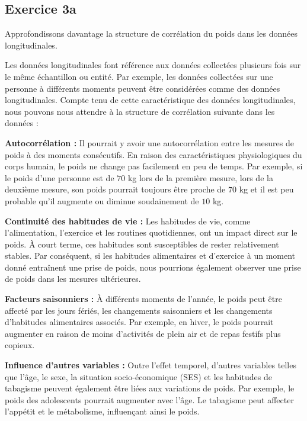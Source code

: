 \documentclass[../main.tex]{subfiles}
\begin{document}
\begin{CJK*}{UTF8}{gbsn}

\section*{Exercice 3a}

Approfondissons davantage la structure de corrélation du poids dans les données longitudinales.

Les données longitudinales font référence aux données collectées plusieurs fois sur le même échantillon ou entité. 
Par exemple, les données collectées sur une personne à différents 
moments peuvent être considérées comme des données longitudinales. 
Compte tenu de cette caractéristique des données longitudinales, 
nous pouvons nous attendre à la structure de corrélation suivante dans les données :

\textbf{Autocorrélation :} 
Il pourrait y avoir une autocorrélation entre les mesures de poids à des moments consécutifs. 
En raison des caractéristiques physiologiques du corps humain, 
le poids ne change pas facilement en peu de temps. 
Par exemple, si le poids d'une personne est de $70$ kg lors de la première mesure, 
lors de la deuxième mesure, son poids pourrait toujours être proche de $70$ kg et
 il est peu probable qu'il augmente ou diminue soudainement de $10$ kg.

\textbf{Continuité des habitudes de vie :} 
Les habitudes de vie, comme l'alimentation, 
l'exercice et les routines quotidiennes, ont un impact direct sur le poids. 
À court terme, ces habitudes sont susceptibles de rester relativement stables. 
Par conséquent, si les habitudes alimentaires et d'exercice à un moment donné entraînent une prise de poids, 
nous pourrions également observer une prise de poids dans les mesures ultérieures.

\textbf{Facteurs saisonniers :} 
À différents moments de l'année, le poids peut être affecté par les jours fériés, 
les changements saisonniers et les changements d'habitudes alimentaires associés. 
Par exemple, en hiver, le poids pourrait augmenter en raison 
de moins d'activités de plein air et de repas festifs plus copieux.

\textbf{Influence d'autres variables :} 
Outre l'effet temporel, d'autres variables telles que l'âge, le sexe, 
la situation socio-économique (SES) et les habitudes de 
tabagisme peuvent également être liées aux variations de poids. 
Par exemple, le poids des adolescents pourrait augmenter avec l'âge. 
Le tabagisme peut affecter l'appétit et le métabolisme, influençant ainsi le poids.


\end{CJK*}
\end{document}

